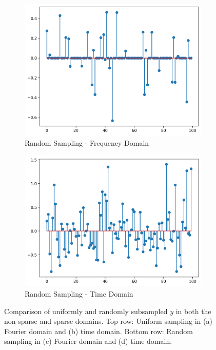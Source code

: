 \documentclass[11pt]{article}
\begin{document}
\begin{figure}[H]
    \begin{subfigure}{.45\textwidth}
        \centering
        \includegraphics[width=\linewidth]{figs/q2b_randomly_subsampled_signal_fft.png}
        \caption{Random Sampling - Frequency Domain}
        \label{fig:random_subsampled_signal_fft}
    \end{subfigure}%
    \begin{subfigure}{.45\textwidth}
        \centering
        \includegraphics[width=\linewidth]{figs/q2b_randomly_subsampled_signal.png}
        \caption{Random Sampling - Time Domain}
        \label{fig:random_subsampled_signal}
    \end{subfigure}
    
    \caption{Comparison of uniformly and randomly subsampled \( y \) in both the non-sparse and sparse domains. Top row: Uniform sampling in (a) Fourier domain and (b) time domain. Bottom row: Random sampling in (c) Fourier domain and (d) time domain.}
    \label{fig:compressed_sensing_sub_sampled_signals_combined}
\end{figure}
\end{document}
